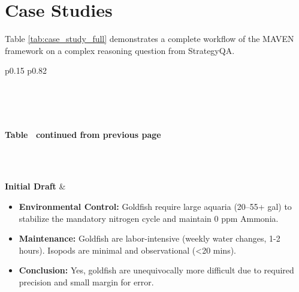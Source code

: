 \documentclass{article}
\begin{document}
\section{Case Studies}
\label{app:case_study}
Table \ref{tab:case_study_full} demonstrates a complete workflow of the MAVEN framework on a complex reasoning question from StrategyQA.

\begin{longtable}{p{} p{}}
\caption{MAVEN Case Study (Full Deliberation Trace). Complete operational trace demonstrating the rigorous fact-checking and causal refinement on a StrategyQA query. The system autonomously escalates the reasoning from a basic hobbyist level to an advanced biological and ecological comparison.}
\label{tab:case_study_full} \\
\toprule
{} \\
 \\
\midrule
\endfirsthead

{{\bfseries Table \thetable\ continued from previous page}} \\
\toprule
\endhead

\midrule {} \\ \midrule
\endfoot

\bottomrule
\endlastfoot
{} \\
\textbf{Initial Draft} & 
\begin{itemize}[nosep, leftmargin=1.5em]
    \item \textbf{Environmental Control:} Goldfish require large aquaria (20--55+ gal) to stabilize the mandatory nitrogen cycle and maintain 0 ppm Ammonia.
    \item \textbf{Maintenance:} Goldfish are labor-intensive (weekly water changes, 1-2 hours). Isopods are minimal and observational (<20 mins).
    \item \textbf{Conclusion:} Yes, goldfish are unequivocally more difficult due to required precision and small margin for error.
\end{itemize} \\
\midrule


\end{longtable}
\end{document}
